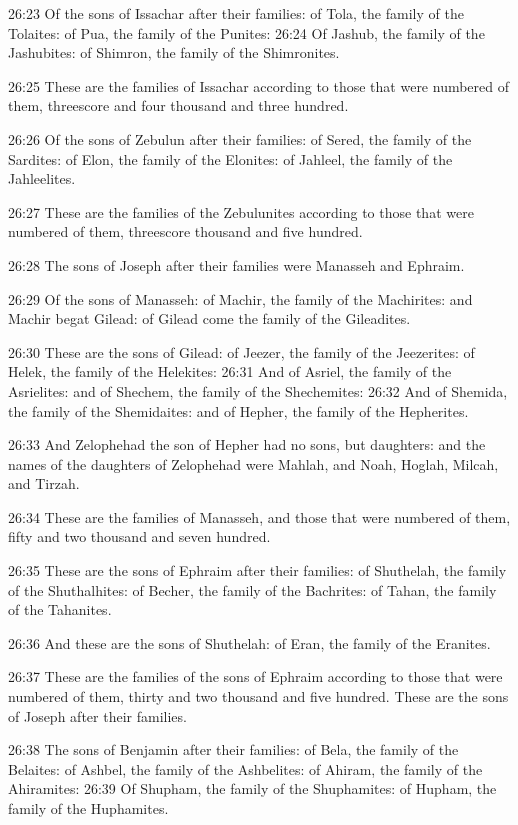 26:23 Of the sons of Issachar after their families: of Tola, the family of the Tolaites: of Pua, the family of the Punites: 26:24 Of Jashub, the family of the Jashubites: of Shimron, the family of the Shimronites.

26:25 These are the families of Issachar according to those that were numbered of them, threescore and four thousand and three hundred.

26:26 Of the sons of Zebulun after their families: of Sered, the family of the Sardites: of Elon, the family of the Elonites: of Jahleel, the family of the Jahleelites.

26:27 These are the families of the Zebulunites according to those that were numbered of them, threescore thousand and five hundred.

26:28 The sons of Joseph after their families were Manasseh and Ephraim.

26:29 Of the sons of Manasseh: of Machir, the family of the Machirites: and Machir begat Gilead: of Gilead come the family of the Gileadites.

26:30 These are the sons of Gilead: of Jeezer, the family of the Jeezerites: of Helek, the family of the Helekites: 26:31 And of Asriel, the family of the Asrielites: and of Shechem, the family of the Shechemites: 26:32 And of Shemida, the family of the Shemidaites: and of Hepher, the family of the Hepherites.

26:33 And Zelophehad the son of Hepher had no sons, but daughters: and the names of the daughters of Zelophehad were Mahlah, and Noah, Hoglah, Milcah, and Tirzah.

26:34 These are the families of Manasseh, and those that were numbered of them, fifty and two thousand and seven hundred.

26:35 These are the sons of Ephraim after their families: of Shuthelah, the family of the Shuthalhites: of Becher, the family of the Bachrites: of Tahan, the family of the Tahanites.

26:36 And these are the sons of Shuthelah: of Eran, the family of the Eranites.

26:37 These are the families of the sons of Ephraim according to those that were numbered of them, thirty and two thousand and five hundred.  These are the sons of Joseph after their families.

26:38 The sons of Benjamin after their families: of Bela, the family of the Belaites: of Ashbel, the family of the Ashbelites: of Ahiram, the family of the Ahiramites: 26:39 Of Shupham, the family of the Shuphamites: of Hupham, the family of the Huphamites.

